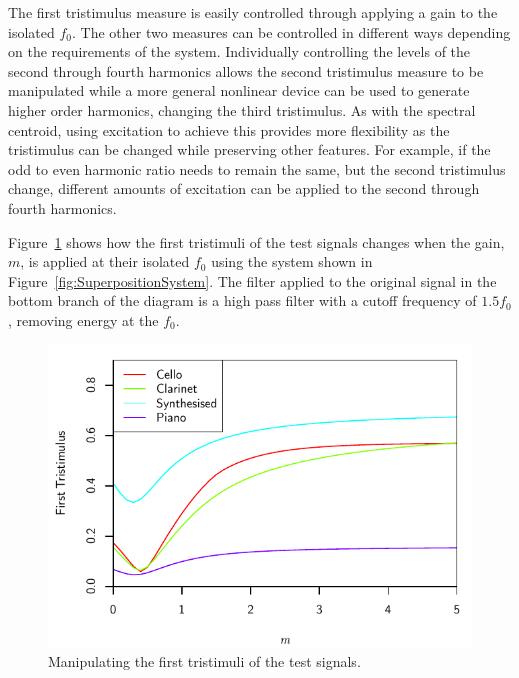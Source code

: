 		The first tristimulus measure is easily controlled through applying a gain to the isolated $f_{0}$.  The
		other two measures can be controlled in different ways depending on the requirements of the system.
		Individually controlling the levels of the second through fourth harmonics allows the second tristimulus
		measure to be manipulated while a more general nonlinear device can be used to generate higher order
		harmonics, changing the third tristimulus. As with the spectral centroid, using excitation to achieve this
		provides more flexibility as the tristimulus can be changed while preserving other features. For example,
		if the odd to even harmonic ratio needs to remain the same, but the second tristimulus change, different
		amounts of excitation can be applied to the second through fourth harmonics.

		Figure~\ref{fig:MoveTristimulus1} shows how the first tristimuli of the test signals changes when the gain,
		$m$, is applied at their isolated $f_{0}$ using the system shown in Figure~\ref{fig:SuperpositionSystem}.
		The filter applied to the original signal in the bottom branch of the diagram is a high pass filter
		with a cutoff frequency of $1.5f_{0}$, removing energy at the $f_{0}$.

		\begin{figure}[h!]
			\centering
			\includegraphics{chapter6/Images/MoveTristimulus1.pdf}
			\caption{Manipulating the first tristimuli of the test signals.}
			\label{fig:MoveTristimulus1}
		\end{figure}

